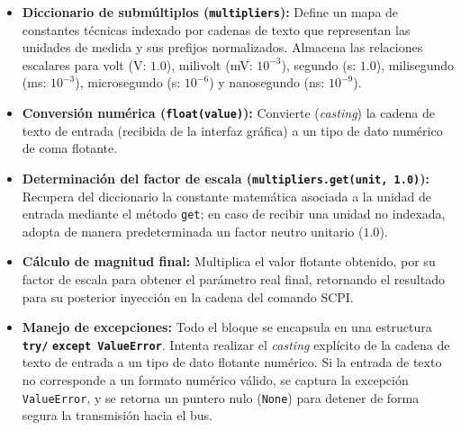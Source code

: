 \begin{itemize}
\item \textbf{Diccionario de submúltiplos (\texttt{multipliers}):} Define un mapa de constantes técnicas indexado por cadenas de texto que representan las unidades de medida y sus prefijos normalizados. Almacena las relaciones escalares para volt (V: $1.0$), milivolt (mV: $10^{-3}$), segundo (s: $1.0$), milisegundo (ms: $10^{-3}$), microsegundo (\textmu s: $10^{-6}$) y nanosegundo (ns: $10^{-9}$).
\item \textbf{Conversión numérica (\texttt{float(value)}):} Convierte (\textit{casting}) la cadena de texto de entrada (recibida de la interfaz gráfica) a un tipo de dato numérico de coma flotante.
\item \textbf{Determinación del factor de escala (\texttt{multipliers.get(unit, 1.0)}):} Recupera del diccionario la constante matemática asociada a la unidad de entrada mediante el método \texttt{get}; en caso de recibir una unidad no indexada, adopta de manera predeterminada un factor neutro unitario ($1.0$).
\item \textbf{Cálculo de magnitud final:} Multiplica el valor flotante obtenido, por su factor de escala para obtener el parámetro real final, retornando el resultado para su posterior inyección en la cadena del comando SCPI.
\item \textbf{Manejo de excepciones:} Todo el bloque se encapsula en una estructura \textbf{\texttt{try/}} \textbf{\texttt{except ValueError}}. Intenta realizar el \textit{casting} explícito de la cadena de texto de entrada a un tipo de dato flotante numérico. Si la entrada de texto no corresponde a un formato numérico válido, se captura la excepción \texttt{ValueError}, y se retorna un puntero nulo (\texttt{None}) para detener de forma segura la transmisión hacia el bus.
\end{itemize}